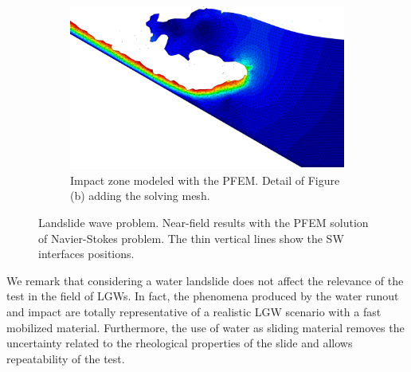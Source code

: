 \begin{figure}[p]
    \begin{subfigure}[c]{\columnwidth}
        \centering
        \begin{minipage}[b]{0.35\textwidth}
            \caption{Impact zone modeled with the PFEM. Detail of Figure (b) adding the solving mesh. }
            \label{t07pfemTest2Zoom}
        \end{minipage}
        \begin{minipage}[c]{0.4\textwidth}
            \includegraphics[width=\textwidth]{img/coupling/t15zoom.png}
        \end{minipage}
    \end{subfigure}

    \caption{Landslide wave problem. Near-field results with the PFEM solution of Navier-Stokes problem. The thin vertical lines show the SW interfaces positions.}
    \label{PFEMresultsTest2}
\end{figure}




We remark that considering a water landslide does not affect the relevance of the test in the field of LGWs. In fact, the phenomena produced by the water runout and impact are totally representative of a realistic LGW scenario with a fast mobilized material. Furthermore, the use of water as sliding material removes the uncertainty related to the rheological properties of the slide and allows repeatability of the test. 


